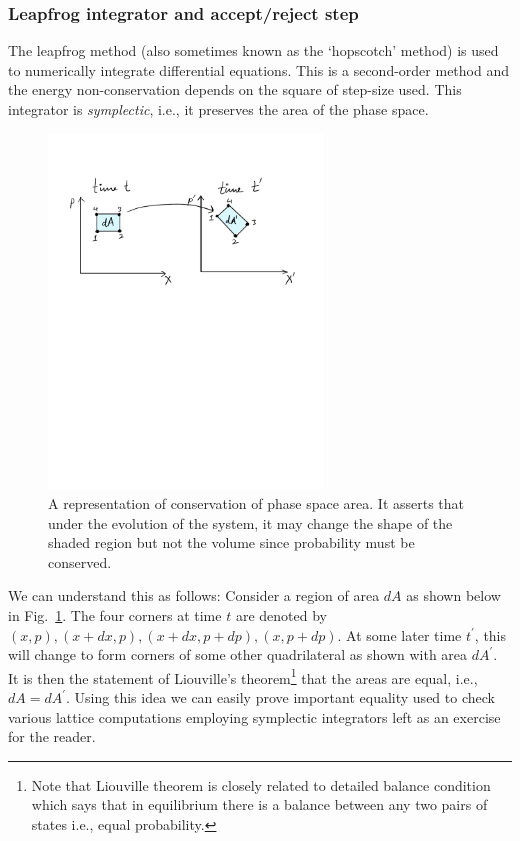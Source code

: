 \documentclass[letter,11pt]{article}
\begin{document}
\subsubsection{Leapfrog integrator and accept/reject step}
The leapfrog method (also sometimes known as the `hopscotch' method) 
is used to numerically integrate differential equations. This is a second-order 
method and the energy non-conservation depends on the square of step-size used. This integrator is \emph{symplectic}, i.e., it preserves the 
area of the phase space. 
\begin{figure}[htbp] 
	\centering 
	\includegraphics[width=0.65\textwidth]{figs/PSP.pdf}
	\caption{\label{fig:PSP1}A representation of conservation of phase space area. It asserts that under the evolution of the system, it may change the shape of the shaded region but not the volume since probability must be conserved.}
\end{figure} 
We can understand this as follows: 
Consider a region of area $dA$ as shown below in Fig.~\ref{fig:PSP1}. The four corners at time $t$ are denoted by $(x, p), (x+dx, p), (x+dx, p+dp),(x, p+dp)$. At some later time $t^{\prime}$, this will change to form corners of some other quadrilateral as shown with area $dA^{\prime}$. It is then the statement of Liouville's theorem\footnote{Note that Liouville theorem is closely related to detailed balance condition which says that in equilibrium there is a balance between any two pairs of states i.e., equal probability.} that the areas are equal, i.e., $dA = dA^{\prime}$. Using this idea we can easily prove important equality used to check various lattice computations employing symplectic integrators left as an exercise for the reader. 
\end{document}
